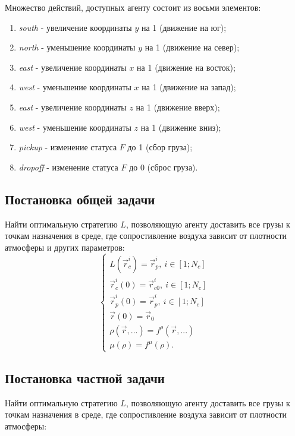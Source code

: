 \documentclass[12pt, a4paper]{report}
\theoremstyle{definition}
\theoremstyle{plain}
\theoremstyle{remark}
\theoremstyle{remark}
\theoremstyle{definition}
\begin{document}
Множество действий, доступных агенту состоит из восьми элементов:
\begin{enumerate}
	\item \textit{south} - увеличение координаты $y$ на 1 (движение на юг);
	\item \textit{north} - уменьшение координаты $y$ на 1 (движение на север);
	\item \textit{east} - увеличение координаты $x$ на 1 (движение на восток);
	\item \textit{west} - уменьшение координаты $x$ на 1 (движение на запад);
	\item \textit{east} - увеличение координаты $z$ на 1 (движение вверх);
	\item \textit{west} - уменьшение координаты $z$ на 1 (движение вниз);
	\item \textit{pickup} - изменение статуса $F$ до 1 (сбор груза);
	\item \textit{dropoff} - изменение статуса $F$ до 0 (сброс груза).	
\end{enumerate}

\subsection{Постановка общей задачи}
Найти оптимальную стратегию $L$, позволяющую агенту доставить все грузы к точкам назначения в среде, где сопростивление воздуха зависит от плотности атмосферы и других параметров:
\begin{equation*}
	\begin{cases}
		L(\vec{r}_{c}^{i}) = \vec{r}_{p}^{i},\ i \in [1;N_{c}]\\
		\vec{r}_{c}^{i} (0) = \vec{r}_{c0}^{i},\ i \in [1;N_{c}]\\
		\vec{r}_{p}^{i} (0) = \vec{r}_{p}^{i},\ i \in [1;N_{c}]\\
		\vec{r}(0) = \vec{r}_{0} \\
		\rho (\vec{r},...)= f^{\rho}(\vec{r},...) \\
		\mu (\rho)= f^{\mu}(\rho).
	\end{cases}	
\end{equation*}
\subsection{Постановка частной задачи}
Найти оптимальную стратегию $L$, позволяющую агенту доставить все грузы к точкам назначения в среде, где сопростивление воздуха зависит от плотности атмосферы:
\end{document}
